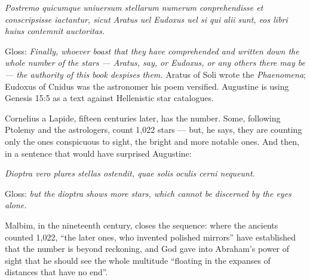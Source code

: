 \begin{studyframe}
\textit{Postremo quicumque uniuersum stellarum numerum conprehendisse et
conscripsisse iactantur, sicut Aratus uel Eudoxus uel si qui alii sunt, eos libri
huius contemnit auctoritas.}
\end{studyframe}

\noindent Gloss: \emph{Finally, whoever boast that they have comprehended and
written down the whole number of the stars --- Aratus, say, or Eudoxus, or any
others there may be --- the authority of this book despises them.} Aratus of Soli
wrote the \textit{Phaenomena}; Eudoxus of Cnidus was the astronomer his poem
versified. Augustine is using Genesis 15:5 as a text against Hellenistic star
catalogues.

Cornelius a Lapide, fifteen centuries later, has the number. Some, following
Ptolemy and the astrologers, count 1,022 stars --- but, he says, they are
counting only the ones conspicuous to sight, the bright and more notable ones.
And then, in a sentence that would have surprised Augustine:

\begin{studyframe}
\textit{Dioptra vero plures stellas ostendit, quae solis oculis cerni
nequeunt.}
\end{studyframe}

\noindent Gloss: \emph{but the dioptra shows more stars, which cannot be
discerned by the eyes alone.}

Malbim, in the nineteenth century, closes the sequence: where the ancients
counted 1,022, ``the later ones, who invented polished mirrors'' have established
that the number is beyond reckoning, and God gave into Abraham's power of sight
that he should see the whole multitude ``floating in the expanses of distances
that have no end''.


